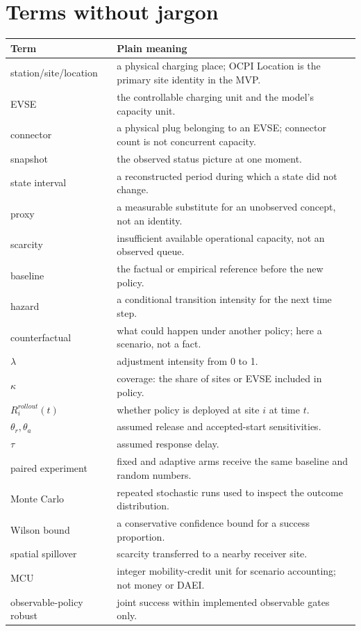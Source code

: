 \documentclass[11pt,a4paper]{article}
\begin{document}
\section{Terms without jargon}

\begin{longtable}{p{3.8cm}p{12.2cm}}
\toprule Term & Plain meaning \\\midrule\endhead
station/site/location & a physical charging place; OCPI Location is the primary site identity in the MVP. \\
EVSE & the controllable charging unit and the model's capacity unit. \\
connector & a physical plug belonging to an EVSE; connector count is not concurrent capacity. \\
snapshot & the observed status picture at one moment. \\
state interval & a reconstructed period during which a state did not change. \\
proxy & a measurable substitute for an unobserved concept, not an identity. \\
scarcity & insufficient available operational capacity, not an observed queue. \\
baseline & the factual or empirical reference before the new policy. \\
hazard & a conditional transition intensity for the next time step. \\
counterfactual & what could happen under another policy; here a scenario, not a fact. \\
$\lambda$ & adjustment intensity from 0 to 1. \\
$\kappa$ & coverage: the share of sites or EVSE included in policy. \\
$R_i^{rollout}(t)$ & whether policy is deployed at site $i$ at time $t$. \\
$\theta_r,\theta_a$ & assumed release and accepted-start sensitivities. \\
$\tau$ & assumed response delay. \\
paired experiment & fixed and adaptive arms receive the same baseline and random numbers. \\
Monte Carlo & repeated stochastic runs used to inspect the outcome distribution. \\
Wilson bound & a conservative confidence bound for a success proportion. \\
spatial spillover & scarcity transferred to a nearby receiver site. \\
MCU & integer mobility-credit unit for scenario accounting; not money or DAEI. \\
observable-policy robust & joint success within implemented observable gates only. \\
\bottomrule
\end{longtable}
\end{document}
